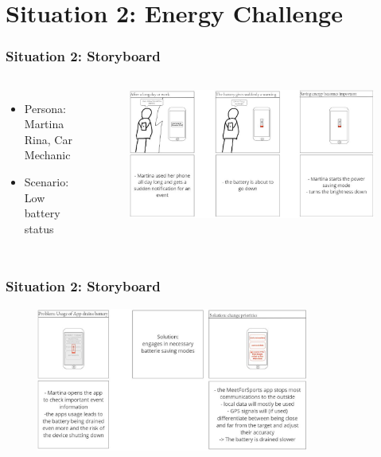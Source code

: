\documentclass[aspectratio=169]{beamer}
\begin{document}
\section{Situation 2:  Energy Challenge}
\begin{frame}   
	\frametitle{Situation 2:  Storyboard}
	\begin{columns}
		\begin{itemize}
			\item Persona: Martina Rina, Car Mechanic
			\item Scenario: Low battery status
		\end{itemize}
		 \begin{figure}
			\centering
			\includegraphics[width=1\textwidth]{media/Storyboard_2_1.jpg}
		\end{figure}
	\end{columns}
\end{frame}

\begin{frame}   
	\frametitle{Situation 2:  Storyboard}
	\begin{figure}
		\centering
		\includegraphics[width=0.8\textwidth]{media/Storyboard_2_2.jpg}
	\end{figure}
\end{frame}
\end{document}
